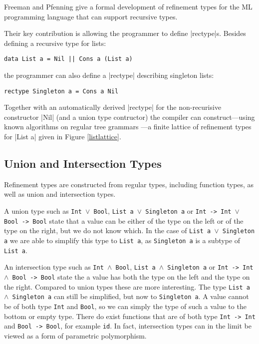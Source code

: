 Freeman and Pfenning \cite{Freeman:1991:RTM:113445.113468,Freeman94refinementtypes} give a formal development of refinement types for the ML programming language that can support recursive types.

Their key contribution is allowing the programmer to define |rectype|s. Besides defining a recursive type for lists:

\begin{verbatim}
data List a = Nil || Cons a (List a)
\end{verbatim}

the programmer can also define a |rectype| describing singleton lists:

\begin{verbatim}
rectype Singleton a = Cons a Nil
\end{verbatim}

Together with an automatically derived |rectype| for the non-recurisive constructor |Nil| (and a union type contructor) the compiler can construct---using known algorithms on regular tree grammars \cite{DBLP:books/others/tree1984}---a finite lattice of refinement types for |List a| given in Figure \ref{listlattice}.

\subsection{Union and Intersection Types}\label{secit}

Refinement types are constructed from regular types, including function types, as well as union and intersection types.

A union type such as {\tt Int $\lor$ Bool}, {\tt List a $\lor$ Singleton a} or {\tt Int -> Int $\lor$ Bool -> Bool} state that a value can be either of the type on the left or of the type on the right, but we do not know which. In the case of {\tt List a $\lor$ Singleton a} we are able to simplify this type to {\tt List a}, as {\tt Singleton a} is a subtype of {\tt List a}.

An intersection type such as {\tt Int $\land$ Bool}, {\tt List a $\land$ Singleton a} or {\tt Int -> Int $\land$ Bool -> Bool} state the a value has both the type on the left and the type on the right. Compared to union types these are more interesting. The type {\tt List a $\land$ Singleton a} can still be simplified, but now to {\tt Singleton a}. A value cannot be of both type {\tt Int} and {\tt Bool}, so we can simply the type of such a value to the bottom or empty type. There do exist functions that are of both type {\tt Int -> Int} and {\tt Bool -> Bool}, for example {\tt id}. In fact, intersection types can in the limit be viewed as a form of parametric polymorphism.


